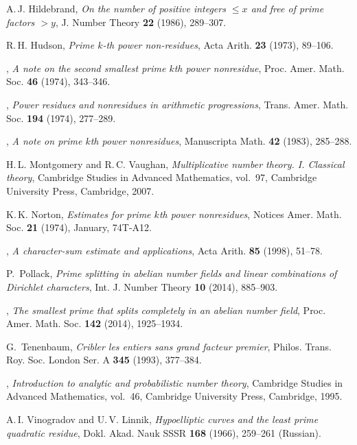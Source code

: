 \documentclass{scrartcl}
\theoremstyle{plain}
\theoremstyle{remark}
\newcommand{\1}{\mathbf{1}}
\begin{document}
{\begin{thebibliography}{10}
{A.\,J.} Hildebrand, \emph{On the number of positive integers {$\leq x$} and
  free of prime factors {$>y$}}, J. Number Theory \textbf{22} (1986), 289--307.

{R.\,H.} Hudson, \emph{Prime {$k$}-th power non-residues}, Acta Arith.
  \textbf{23} (1973), 89--106.

\bysame, \emph{A note on the second smallest prime {$k$}th power nonresidue},
  Proc. Amer. Math. Soc. \textbf{46} (1974), 343--346.

\bysame, \emph{Power residues and nonresidues in arithmetic progressions},
  Trans. Amer. Math. Soc. \textbf{194} (1974), 277--289.

\bysame, \emph{A note on prime {$k$}th power nonresidues}, Manuscripta Math.
  \textbf{42} (1983), 285--288.

{H.\,L.} Montgomery and {R.\,C.} Vaughan, \emph{Multiplicative number theory.
  {I}. {C}lassical theory}, Cambridge Studies in Advanced Mathematics, vol.~97,
  Cambridge University Press, Cambridge, 2007.

{K.\,K.} Norton, \emph{Estimates for prime $k$th power nonresidues}, Notices
  Amer. Math. Soc. \textbf{21} (1974), January, 74T-A12.

\bysame, \emph{A character-sum estimate and applications}, Acta Arith.
  \textbf{85} (1998), 51--78.

P.~Pollack, \emph{Prime splitting in abelian number fields and linear
  combinations of {D}irichlet characters}, Int. J. Number Theory \textbf{10}
  (2014), 885--903.

\bysame, \emph{The smallest prime that splits completely in an abelian number
  field}, Proc. Amer. Math. Soc. \textbf{142} (2014), 1925--1934.

G.~Tenenbaum, \emph{Cribler les entiers sans grand facteur premier}, Philos.
  Trans. Roy. Soc. London Ser. A \textbf{345} (1993), 377--384.

\bysame, \emph{Introduction to analytic and probabilistic number theory},
  Cambridge Studies in Advanced Mathematics, vol.~46, Cambridge University
  Press, Cambridge, 1995.

{A.\,I.} Vinogradov and {U.\,V.} Linnik, \emph{Hypoelliptic curves and the
  least prime quadratic residue}, Dokl. Akad. Nauk SSSR \textbf{168} (1966),
  259--261 (Russian).


\end{thebibliography}}
\end{document}
